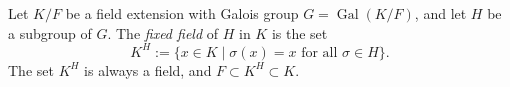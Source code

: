 \documentclass[12pt]{article}
\begin{document}
Let $K/F$ be a field extension with Galois group $G = \operatorname{Gal}(K/F)$, and let $H$ be a subgroup of $G$. The {\em fixed field} of $H$ in $K$ is the set
$$
K^H := \{ x \in K \mid \sigma(x) = x\text{ for all }\sigma \in H \}.
$$
The set $K^H$ is always a field, and $F \subset K^H \subset K$.
\end{document}
